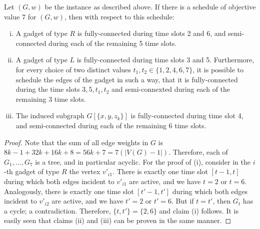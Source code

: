 \documentclass[runningheads]{llncs}
\newcommand{\set}[1]{\{ #1 \}}
\begin{document}
\begin{lemma}
\label{lemma:gadgets_properties}
Let $(G, w)$ be the instance as described above. If there is a schedule of objective value 7 for $(G, w)$, then with respect to this schedule:
\begin{enumerate}[(i)]
\item A gadget of type $R$ is fully-connected during time slots 2 and 6, and semi-connected during each of the remaining 5 time slots.
\item A gadget of type $L$ is fully-connected during time slots 3 and 5. Furthermore, for every choice of two distinct values $t_1, t_2 \in \set{1,2,4,6,7}$, it is possible to schedule the edges of the gadget in such a way, that it is fully-connected during the time slots $3, 5, t_1, t_2$ and semi-connexted during each of the remaining 3 time slots.
\item The induced subgraph $G[\set{x, y, z_k}]$ is fully-connected during time slot 4, and semi-connected during each of the remaining 6 time slots.
\end{enumerate}
\end{lemma}
\begin{proof}
 Note that the sum of all edge weights in $G$ is $8k - 1 + 32k + 16k + 8 = 56k + 7 = 7(|V(G) - 1|)$. Therefore, each of $G_{1}, \ldots, G_{7}$ is a tree, and in particular acyclic. For the proof of (i), consider in the $i$-th gadget of type $R$ the vertex $v'_{i1}$. There is exactly one time slot $[t-1, t]$ during which both edges incident to $v'_{i1}$ are active, and we have $t = 2$ or $t = 6$. Analogously, there is exactly one time slot $[t'-1, t']$ during which both edges incident to $v'_{i2}$ are active, and we have $t' = 2$ or $t' = 6$. But if $t = t'$, then $G_t$ has a cycle; a contradiction. Therefore, $\set{t, t'} = \set{2, 6}$ and claim (i) follows. It is easily seen that claims (ii) and (iii) can be proven in the same manner. 
\end{proof}
\end{document}
